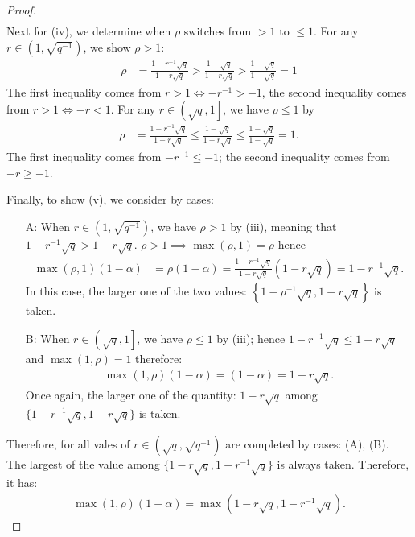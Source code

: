 \documentclass[12pt]{article}
\begin{document}
\begin{proof}
\begin{align*}
        \end{align*}
        Next for (iv), we determine when $\rho$ switches from $> 1$ to $ \le 1$. 
        For any $r \in \left(1, \sqrt{q^{-1}}\right)$, we show $\rho > 1$: 
        \begin{align*}
            \rho &= \frac{1 - r^{-1}\sqrt{q}}{1 - r \sqrt{q}} 
            > \frac{1 - \sqrt{q}}{1 - r \sqrt{q}} > \frac{1 - \sqrt{q}}{1 - \sqrt{q}} = 1
        \end{align*}
        The first inequality comes from $r > 1 \iff -r^{-1} > -1$, the second inequality comes from $r > 1 \iff -r < 1$. 
        For any $r \in \left(\sqrt{q}, 1\right]$, we have $\rho \le 1$ by 
        \begin{align*}
            \rho &= \frac{1 - r^{-1}\sqrt{q}}{1 - r \sqrt{q}} 
            \le \frac{1 - \sqrt{q}}{1 - r \sqrt{q}} \le \frac{1 - \sqrt{q}}{1 - \sqrt{q}} = 1. 
        \end{align*}
        The first inequality comes from $-r^{-1} \le - 1$; the second inequality comes from $-r \ge -1$. 
        \par
        Finally, to show (v), we consider by cases: 
        \begin{enumerate}
            \item[A:] When $r \in \left(1, \sqrt{q^{-1}}\right)$, we have $\rho > 1$ by (iii), meaning that $1 - r^{-1}\sqrt{q} > 1 - r \sqrt{q}$. $\rho > 1 \implies \max(\rho, 1) = \rho$ hence 
                \begin{align*}
                    \max(\rho, 1)(1 - \alpha) &= \rho(1- \alpha)
                    = \frac{1 - r^{-1}\sqrt{q}}{1 - r \sqrt{q}}(1 - r \sqrt{q}) = 1 - r^{-1}\sqrt{q}. 
                \end{align*}
                In this case, the larger one of the two values: $\left\lbrace1 - \rho^{-1}\sqrt{q}, 1 - r\sqrt{q}\right\rbrace$ is taken. 
            \item[B:] When $r \in \left(\sqrt{q}, 1\right]$, we have $\rho \le 1$ by (iii); hence $1 - r^{-1}\sqrt{q} \le 1 - r \sqrt{q}$ and $\max(1,\rho) = 1$ therefore: 
            \begin{align*}
                \max(1, \rho)(1 - \alpha) = (1 - \alpha) = 1 - r \sqrt{q}. 
            \end{align*}
            Once again, the larger one of the quantity: $1 - r \sqrt{q}$ among $\{1 - r^{-1}\sqrt{q}, 1 - r\sqrt{q}\}$ is taken. 
        \end{enumerate}
        Therefore, for all vales of $r \in \left(\sqrt{q}, \sqrt{q^{-1}}\right)$ are completed by cases: (A), (B).
        The largest of the value among $\{1 - r \sqrt{q}, 1 - r^{-1}\sqrt{q}\}$ is always taken. 
        Therefore, it has: 
        \begin{align*}
            \max(1, \rho)(1 - \alpha) = \max\left(1 - r\sqrt{q}, 1 - r^{-1}\sqrt{q}\right). 
        \end{align*}

    \end{proof}
\end{document}
